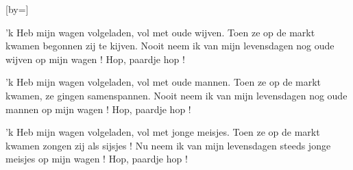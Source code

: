  

[by=]




\beginverse
    'k Heb mijn wagen volgeladen, vol met oude wijven.
    Toen ze op de markt kwamen begonnen zij te kijven.
    Nooit neem ik van mijn levensdagen
    nog oude wijven op mijn wagen ! Hop, paardje hop !
\endverse

\beginverse
    'k Heb mijn wagen volgeladen, vol met oude mannen.
    Toen ze op de markt kwamen, ze gingen samenspannen.
    Nooit neem ik van mijn levensdagen
    nog oude mannen op mijn wagen ! Hop, paardje hop !
\endverse

\beginverse
    'k Heb mijn wagen volgeladen, vol met jonge meisjes.
    Toen ze op de markt kwamen zongen zij als sijsjes !
    Nu neem ik van mijn levensdagen
    steeds jonge meisjes op mijn wagen ! Hop, paardje hop !
\endverse




\endsong
